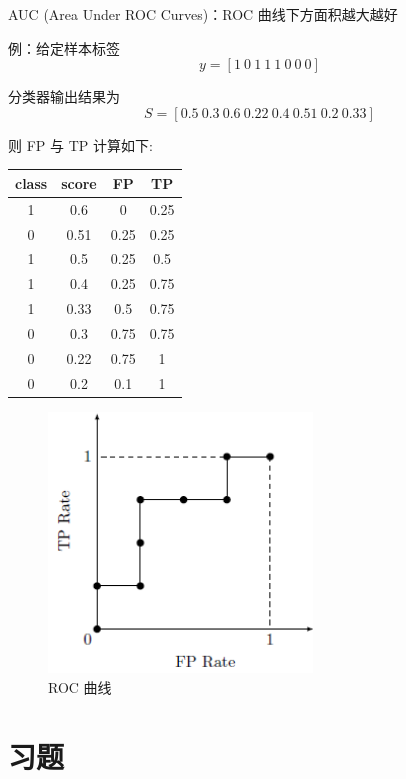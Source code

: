 \documentclass[openany]{ctexbook}
\theoremstyle{kaiti}
\theoremstyle{normal}
\begin{document}
AUC (Area Under ROC Curves)：ROC 曲线下方面积越大越好

例：给定样本标签 
\begin{equation}
y = [1~0~1~1~1~0~0~0]
\end{equation}

分类器输出结果为
\begin{equation}
S = [0.5~0.3~0.6~0.22~0.4~0.51~0.2~0.33]
\end{equation}

则 FP 与 TP 计算如下:

\begin{table}
  \centering
  \begin{tabular}{cccc}
    \hline
    class & score & FP   & TP   \\
    \hline
    1     & 0.6   & 0    & 0.25 \\
    0     & 0.51  & 0.25 & 0.25 \\
    1     & 0.5   & 0.25 & 0.5  \\
    1     & 0.4   & 0.25 & 0.75 \\
    1     & 0.33  & 0.5  & 0.75 \\
    0     & 0.3   & 0.75 & 0.75 \\
    0     & 0.22  & 0.75 & 1    \\
    0     & 0.2   & 0.1  & 1   \\
    \hline
  \end{tabular}
\end{table}

\begin{figure}
  \centering
  \includegraphics[width=7cm]{1627808143710-1.7.png}
  \caption{ROC 曲线}
\end{figure}

\section{习题}
\end{document}
